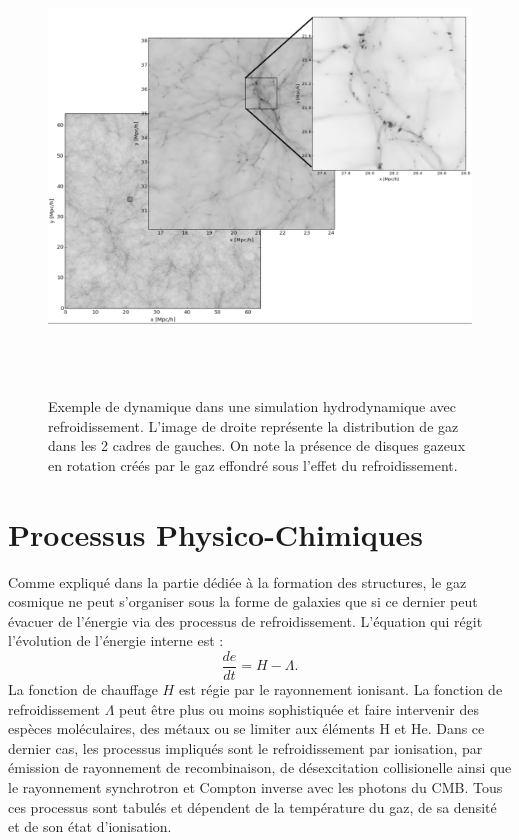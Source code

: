 \begin{figure}[htbp]
	\centering
		\includegraphics[height=12cm]{figs/zoom.png}
	\caption[Exemple de dynamique dans une simulation hydrodynamique avec refroidissement.]{Exemple de dynamique dans une simulation hydrodynamique avec refroidissement. L'image de droite représente la distribution de gaz dans les 2 cadres de gauches. On note la présence de disques gazeux en rotation créés par le gaz effondré sous l'effet du refroidissement.}
	\label{f:zoom}
\end{figure}


\section{Processus Physico-Chimiques}
Comme expliqué dans la partie dédiée à la formation des structures, le gaz cosmique ne peut s'organiser sous la forme de galaxies que si ce dernier peut évacuer de l'énergie via des processus de refroidissement. L'équation qui régit l'évolution de l'énergie interne est :
\begin{equation}
\frac{de}{dt}=H-\Lambda.
\end{equation}
La fonction de chauffage $H$ est régie par le rayonnement ionisant. La fonction de refroidissement $\Lambda$ peut être plus ou moins sophistiquée et faire intervenir des espèces moléculaires, des métaux  ou se limiter aux éléments H et He. Dans ce dernier cas, les processus impliqués sont le refroidissement par ionisation, par émission de rayonnement de recombinaison, de désexcitation collisionelle ainsi que le rayonnement synchrotron et Compton inverse avec les photons du CMB. Tous ces processus sont tabulés et dépendent de la température du gaz, de sa densité et de son état d'ionisation. 

